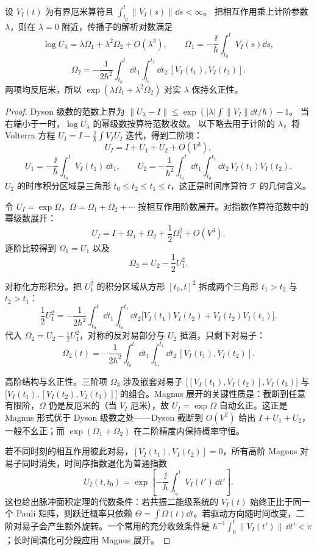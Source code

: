 \begin{proposition}
设 $V_I(t)$ 为有界厄米算符且 $\int_{t_0}^t\|V_I(s)\|\dd s<\infty$。
把相互作用乘上计阶参数 $\lambda$，则在 $\lambda=0$ 附近，传播子的解析对数满足
\[
\log U_\lambda=\lambda\Omega_1+\lambda^2\Omega_2+O(\lambda^3),\qquad
\Omega_1=-\frac{\ii}{\hbar}\int_{t_0}^tV_I(s)\dd s,
\]
\[
\Omega_2=-\frac1{2\hbar^2}\int_{t_0}^t\dd t_1
\int_{t_0}^{t_1}\dd t_2\,[V_I(t_1),V_I(t_2)].
\]
两项均反厄米，所以 $\exp(\lambda\Omega_1+\lambda^2\Omega_2)$ 对实 $\lambda$ 保持幺正性。
\end{proposition}
\begin{proof}
Dyson 级数的范数上界为
$\|U_\lambda-I\|\le\exp(|\lambda|\int\|V_I\|\dd t/\hbar)-1$。
当右端小于一时，$\log U_\lambda$ 的幂级数按算符范数收敛。
以下略去用于计阶的 $\lambda$，将 Volterra 方程
$U_I=I-\frac{\ii}{\hbar}\int V_I U_I$ 迭代，得到二阶项：
\[
U_I=I+U_1+U_2+O(V^3),
\]
\[
U_1=-\frac{\ii}{\hbar}\int_{t_0}^{t}V_I(t_1)\,\dd t_1,
\qquad
U_2=-\frac{1}{\hbar^2}\int_{t_0}^{t}\dd t_1\int_{t_0}^{t_1}\dd t_2\,
V_I(t_1)V_I(t_2).
\]
$U_2$ 的时序积分区域是三角形 $t_0\le t_2\le t_1\le t$，这正是时间序算符 $\mathcal T$ 的几何含义。

令 $U_I=\exp\Omega$，$\Omega=\Omega_1+\Omega_2+\cdots$ 按相互作用阶数展开。对指数作算符范数中的幂级数展开：
\[
U_I=I+\Omega_1+\Omega_2+\frac12\Omega_1^2+O(V^3).
\]
逐阶比较得到 $\Omega_1=U_1$ 以及
\[
\Omega_2=U_2-\frac12U_1^2.
\]

对称化方形积分。把 $U_1^2$ 的积分区域从方形 $[t_0,t]^2$ 拆成两个三角形 $t_1>t_2$ 与 $t_2>t_1$：
\[
\frac12U_1^2
=-\frac{1}{2\hbar^2}\int_{t_0}^{t}\dd t_1\int_{t_0}^{t_1}\dd t_2
\bigl[V_I(t_1)V_I(t_2)+V_I(t_2)V_I(t_1)\bigr].
\]
代入 $\Omega_2=U_2-\frac12U_1^2$，对称的反对易部分与 $U_2$ 抵消，只剩下对易子：
\begin{equation}
\Omega_2(t)
=-\frac{1}{2\hbar^2}\int_{t_0}^{t}\dd t_1\int_{t_0}^{t_1}\dd t_2\,
[V_I(t_1),V_I(t_2)].
\label{eq:magnus-second-order}
\end{equation}



\par
高阶结构与幺正性。三阶项 $\Omega_3$ 涉及嵌套对易子 $\bigl[[V_I(t_1),V_I(t_2)],V_I(t_3)\bigr]$ 与 $\bigl[V_I(t_1),[V_I(t_2),V_I(t_3)]\bigr]$ 的组合。Magnus 展开的关键性质是：截断到任意有限阶，$\Omega$ 仍是反厄米的（当 $V_I$ 厄米），故 $U_I=\exp\Omega$ 自动幺正。这正是 Magnus 形式优于 Dyson 级数之处——Dyson 截断到 $O(V^2)$ 给出 $I+U_1+U_2$，一般不幺正；而 $\exp(\Omega_1+\Omega_2)$ 在二阶精度内保持概率守恒。

若不同时刻的相互作用彼此对易，$[V_I(t_1),V_I(t_2)]=0$，所有高阶 Magnus 对易子同时消失，时间序指数退化为普通指数
\[
U_I(t,t_0)=\exp\!\left[-\frac{\ii}{\hbar}\int_{t_0}^{t}V_I(t')\,\dd t'\right].
\]
这也给出脉冲面积定理的代数条件：若共振二能级系统的 $V_I(t)$ 始终正比于同一个 Pauli 矩阵，则跃迁概率只依赖 $\Theta=\int\Omega(t)\dd t$。若驱动方向随时间改变，二阶对易子会产生额外旋转。一个常用的充分收敛条件是 $\hbar^{-1}\int_0^t\|V_I(t')\|\,\dd t'<\pi$；长时间演化可分段应用 Magnus 展开。
\end{proof}

